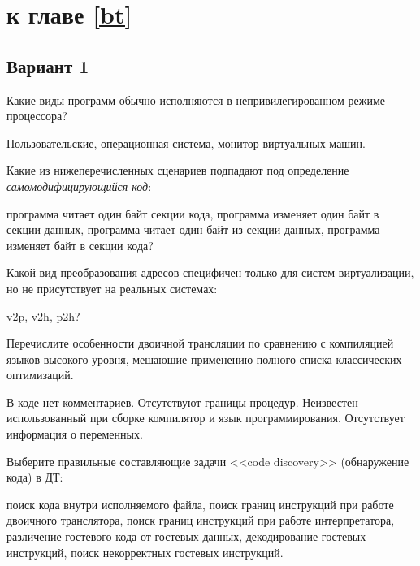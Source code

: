 \section{\Questions к главе \ref{bt}} %

\subsection*{Вариант 1}

\begin{questions}

\question[3] Какие виды программ обычно исполняются в непривилегированном режиме процессора?
\begin{choices}
    \correctchoice Пользовательские,
    \choice операционная система,
    \choice монитор виртуальных машин.
\end{choices}

\question[3] Какие из нижеперечисленных сценариев подпадают под определение \emph{самомодифицирующийся код}:
\begin{choices}
    \choice программа читает один байт  секции кода,
    \choice программа изменяет один байт в секции данных,
    \choice программа читает один байт из секции данных,
    \correctchoice программа изменяет байт в секции кода?
\end{choices}

\question[3] Какой вид преобразования адресов специфичен только для систем виртуализации, но не присутствует на реальных системах:
\begin{choices}
    \choice v2p,
    \correctchoice v2h,
    \choice p2h?
\end{choices}

\question[3] Перечислите особенности двоичной трансляции по сравнению с компиляцией языков высокого уровня, мешаюшие применению полного списка классических оптимизаций.
\begin{choices}
    \choice В коде нет комментариев.
    \correctchoice Отсутствуют границы процедур.
    \choice Неизвестен использованный при сборке компилятор и язык программирования.
    \correctchoice Отсутствует информация о переменных.
\end{choices}

\question[3] Выберите правильные составляющие задачи <<code discovery>> (обнаружение кода) в ДТ:
\begin{choices}
    \choice поиск кода внутри исполняемого файла,
    \correctchoice поиск границ инструкций при работе двоичного транслятора,
    \choice     поиск границ инструкций при работе интерпретатора,
    \correctchoice различение гостевого кода от гостевых данных,
    \choice     декодирование гостевых инструкций,
    \choice поиск некорректных гостевых инструкций.
\end{choices}


\end{questions}
